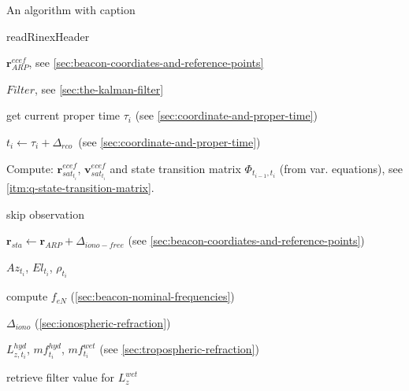 \begin{algorithm}
\caption{An algorithm with caption}\label{alg:two}

\BlankLine
readRinexHeader

 {
  $\bm{r}_{ARP}^{ecef}$, see \ref{sec:beacon-coordiates-and-reference-points}
}

$Filter$, see \ref{sec:the-kalman-filter}


{
  get current proper time $\tau_i$ (see \ref{sec:coordinate-and-proper-time})

  $t_i \gets \tau_i + \Delta_{rco}$\  (see \ref{sec:coordinate-and-proper-time})

  Compute: $\bm{r}_{sat_{t_i}}^{ecef}$, $\bm{v}_{sat_{t_i}}^{ecef}$ and 
  state transition matrix $\Phi _{t_{i-1},t_i}$ (from var. equations), see 
  \ref{itm:q-state-transition-matrix}.

  {
    {
      skip observation
    }
    {
      $\bm{r}_{sta} \gets \bm{r}_{ARP} + \Delta _{iono-free}$ 
      (see \ref{sec:beacon-coordiates-and-reference-points})

      $Az_{t_i}$, $El_{t_i}$, $\rho _{t_i}$

      {
        compute $f_{eN}$ (\ref{sec:beacon-nominal-frequencies})

        $\Delta_{iono}$ (\ref{sec:ionospheric-refraction})

        $L_{z,t_i}^{hyd}$, $mf_{t_i}^{hyd}$, $mf_{t_i}^{wet}$ (see \ref{sec:tropospheric-refraction})

        {
          retrieve filter value for $L_{z}^{wet}$
        }

}}}}
\end{algorithm}
